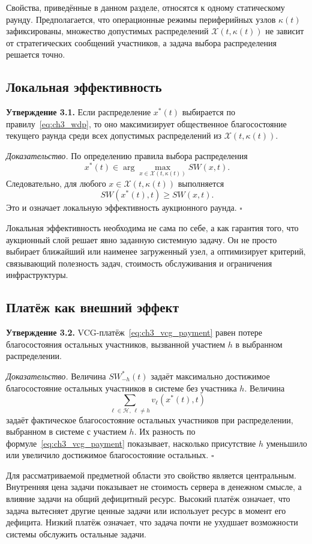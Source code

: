 Свойства, приведённые в данном разделе, относятся к одному статическому раунду. Предполагается, что операционные режимы периферийных узлов $\kappa(t)$ зафиксированы, множество допустимых распределений $\mathcal{X}(t,\kappa(t))$ не зависит от стратегических сообщений участников, а задача выбора распределения решается точно.

\subsection{Локальная эффективность}

\textbf{Утверждение 3.1.} Если распределение $x^*(t)$ выбирается по правилу~\eqref{eq:ch3_wdp}, то оно максимизирует общественное благосостояние текущего раунда среди всех допустимых распределений из $\mathcal{X}(t,\kappa(t))$.

\textit{Доказательство.}
По определению правила выбора распределения
\[
x^*(t)\in\arg\max_{x\in\mathcal{X}(t,\kappa(t))}SW(x,t).
\]
Следовательно, для любого $x\in\mathcal{X}(t,\kappa(t))$ выполняется
\[
SW(x^*(t),t)\geq SW(x,t).
\]
Это и означает локальную эффективность аукционного раунда. \hfill$\square$

Локальная эффективность необходима не сама по себе, а как гарантия того, что аукционный слой решает явно заданную системную задачу. Он не просто выбирает ближайший или наименее загруженный узел, а оптимизирует критерий, связывающий полезность задач, стоимость обслуживания и ограничения инфраструктуры.

\subsection{Платёж как внешний эффект}

\textbf{Утверждение 3.2.} VCG-платёж~\eqref{eq:ch3_vcg_payment} равен потере благосостояния остальных участников, вызванной участием $h$ в выбранном распределении.

\textit{Доказательство.}
Величина $SW^*_{-h}(t)$ задаёт максимально достижимое благосостояние остальных участников в системе без участника $h$. Величина
\[
\sum_{\ell\in\mathcal{H},\,\ell\neq h}v_{\ell}(x^*(t),t)
\]
задаёт фактическое благосостояние остальных участников при распределении, выбранном в системе с участием $h$. Их разность по формуле~\eqref{eq:ch3_vcg_payment} показывает, насколько присутствие $h$ уменьшило или увеличило достижимое благосостояние остальных. \hfill$\square$

Для рассматриваемой предметной области это свойство является центральным. Внутренняя цена задачи показывает не стоимость сервера в денежном смысле, а влияние задачи на общий дефицитный ресурс. Высокий платёж означает, что задача вытесняет другие ценные задачи или использует ресурс в момент его дефицита. Низкий платёж означает, что задача почти не ухудшает возможности системы обслужить остальные задачи.

